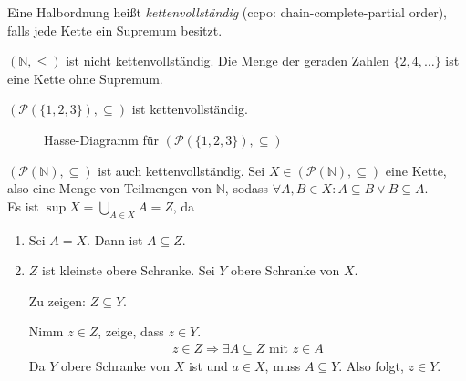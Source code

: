 \par\bigskip
\begin{definition}[Kettenvollständigkeit]
    Eine Halbordnung heißt \emph{kettenvollständig} (ccpo: chain-complete-partial order), falls jede Kette ein Supremum besitzt.
\end{definition}

\par\medskip
\begin{example}
    $(\mathbb{N}, \leq)$ ist nicht kettenvollständig. Die Menge der geraden Zahlen $\{ 2, 4, \dots \}$ ist eine Kette ohne Supremum.

    \par\medskip
    $(\mathcal{P}(\{ 1, 2, 3 \}), \subseteq)$ ist kettenvollständig.
    \begin{figure}[H]
        \centering
        \caption{Hasse-Diagramm für $(\mathcal{P}(\{1,2,3\}), \subseteq)$}
    \end{figure}

    \par\medskip
    $(\mathcal{P}(\mathbb{N}), \subseteq)$ ist auch kettenvollständig. Sei $X \in (\mathcal{P}(\mathbb{N}), \subseteq)$ eine Kette, also eine Menge von Teilmengen von $\mathbb{N}$, sodass $\forall A, B \in X: A \subseteq B \vee B \subseteq A$.\\
    Es ist $\sup X = \bigcup_{A \in X} A = Z$, da \begin{enumerate}
        \item Sei $A = X$. Dann ist $A \subseteq Z$.
        \item $Z$ ist kleinste obere Schranke. Sei $Y$ obere Schranke von $X$.

            Zu zeigen: $Z \subseteq Y$.

            Nimm $z \in Z$, zeige, dass $z \in Y$.
            \begin{align*}
                z \in Z \Rightarrow \exists A \subseteq Z \text{ mit } z \in A
            \end{align*}
            Da $Y$ obere Schranke von $X$ ist und $a \in X$, muss $A \subseteq Y$. Also folgt, $z \in Y$.
    \end{enumerate}
\end{example}

